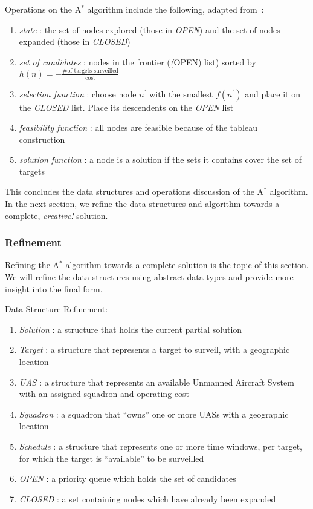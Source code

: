 \documentclass[conference]{IEEEtran}
\newcommand{\heuristic}{${h(n) = -\frac{\text{\# of targets
surveilled}}{\text{cost}}}$}
\begin{document}
Operations on the A$^*$ algorithm include the following, adapted
from~\cite{lamontAstarEx}:

\begin{enumerate}
  \item[] \emph{state} : the set of nodes explored (those in \emph{OPEN}) and
    the set of nodes expanded (those in \emph{CLOSED})
  \item[] \emph{set of candidates} : nodes in the frontier (\emph(OPEN) list)
    sorted by \heuristic
  \item[] \emph{selection function} : choose node $n^\prime$ with the smallest
    $f(n^\prime)$ and place it on the \emph{CLOSED} list. Place its descendents
    on the \emph{OPEN} list
  \item[] \emph{feasibility function} : all nodes are feasible because of the
    tableau construction~\cite{christofides1975}
  \item[] \emph{solution function} : a node is a solution if the sets it
    contains cover the set of targets
\end{enumerate}

This concludes the data structures and operations discussion of the A$^*$
algorithm. In the next section, we refine the data structures and algorithm
towards a complete, \emph{creative!} solution.

\subsubsection{Refinement}

Refining the A$^*$ algorithm towards a complete solution is the topic of this
section. We will refine the data structures using abstract data types and
provide more insight into the final form.

Data Structure Refinement:
\begin{enumerate}
  \item[] \emph{Solution} : a structure that holds the current partial solution
  \item[] \emph{Target} : a structure that represents a target to surveil, with
    a geographic location
  \item[] \emph{UAS} : a structure that represents an available Unmanned
    Aircraft System with an assigned squadron and operating cost
  \item[] \emph{Squadron} : a squadron that ``owns'' one or more UASs with a
    geographic location
  \item[] \emph{Schedule} : a structure that represents one or more time
    windows, per target, for which the target is ``available'' to be surveilled
  \item[] \emph{OPEN} : a priority queue which holds the set of candidates
  \item[] \emph{CLOSED} : a set containing nodes which have already been
    expanded
\end{enumerate}
\end{document}
